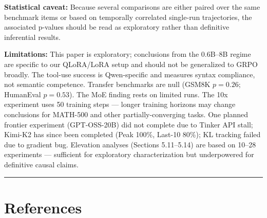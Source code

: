 \documentclass[
  american,
  11pt,
  a4paper,
  oneside]{report}
\begin{document}
\textbf{Statistical caveat:} Because several comparisons are either
paired over the same benchmark items or based on temporally correlated
single-run trajectories, the associated p-values should be read as
exploratory rather than definitive inferential results.

\textbf{Limitations:} This paper is exploratory; conclusions from the
0.6B--8B regime are specific to our QLoRA/LoRA setup and should not be
generalized to GRPO broadly. The tool-use success is Qwen-specific and
measures syntax compliance, not semantic competence. Transfer benchmarks
are null (GSM8K \(p{=}0.26\); HumanEval \(p{=}0.53\)). The MoE finding
rests on limited runs. The 10x experiment uses 50 training steps ---
longer training horizons may change conclusions for MATH-500 and other
partially-converging tasks. One planned frontier experiment
(GPT-OSS-20B) did not complete due to Tinker API stall; Kimi-K2 has
since been completed (Peak 100\%, Last-10 80\%); KL tracking failed due
to gradient bug. Elevation analyses (Sections 5.11--5.14) are based on
10--28 experiments --- sufficient for exploratory characterization but
underpowered for definitive causal claims.

\begin{center}\rule{0.5\linewidth}{0.5pt}\end{center}

\chapter{References}\label{references}
\end{document}
